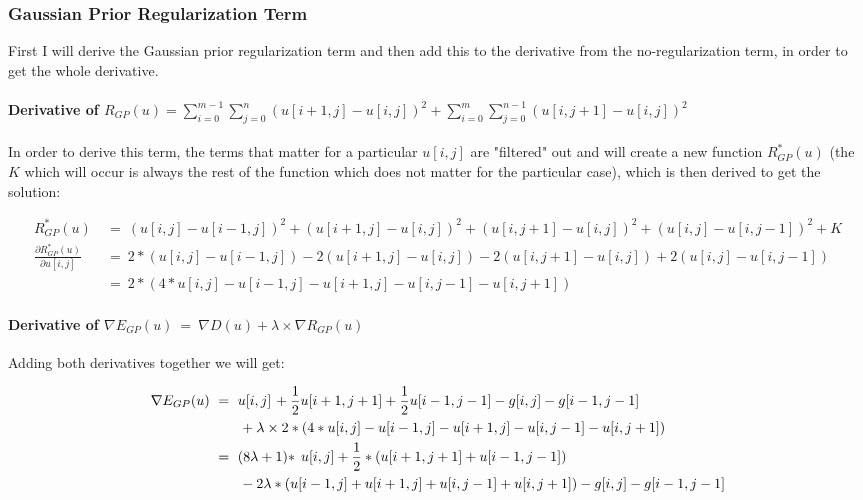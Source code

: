 \documentclass{report}
\begin{document}
			\subsubsection{Gaussian Prior Regularization Term}
			\startsubsection
				First I will derive the Gaussian prior regularization term and then add this to the derivative from the no-regularization term, in order to get the whole derivative.
				\vspace{-0.4cm} \paragraph{Derivative of $R_{GP}(u) = \sum_{i=0}^{m-1} \sum_{j=0}^{n} ( u[i+1,j] - u[i,j] )^2 + \sum_{i=0}^{m} \sum_{j=0}^{n-1} ( u[i,j+1] - u[i,j] )^2$}
				\startsubsection
					\vspace{0.2cm} In order to derive this term, the terms that matter for a particular $u[i,j]$ are "filtered" out and will create a new function $R_{GP}^*(u)$ (the $K$ which will occur is always the rest of the function which does not matter for the particular case), which is then derived to get the solution:
				\closesection
				\begin{adjustwidth}{-4em}{}
					\vspace{-0.5cm}
					\begin{align*}
						R_{GP}^*(u) \ & = \ (u[i,j] - u[i-1,j])^2 + (u[i+1,j] - u[i,j])^2 + (u[i,j+1] - u[i,j])^2 + (u[i,j] - u[i,j-1])^2 + K \\
						\frac{\partial R_{GP}^*(u)}{\partial u[i,j]} \ & = \ 2 * (u[i,j] - u[i-1,j]) - 2 (u[i+1,j] - u[i,j]) - 2 (u[i,j+1] - u[i,j]) + 2 (u[i,j] - u[i,j-1]) \\
						& = \ 2 * (4 * u[i,j] - u[i-1,j] - u[i+1,j] - u[i,j-1] - u[i,j+1])
					\end{align*}
				\end{adjustwidth}
				\vspace{-0.4cm} \paragraph{Derivative of $\nabla E_{GP}(u) \ = \ \nabla D(u) + \lambda \times \nabla R_{GP}(u)$}
				\startsubsection
					Adding both derivatives together we will get:
					\begin{adjustwidth}{-4em}{}
						\vspace{-0.5cm}
						\begin{align*}
							\nabla E_{GP}(u) \ & = \ u[i,j]  && \hspace{-0.9cm} + \frac{1}{2} u[i+1,j+1] + \frac{1}{2} u[i-1,j-1] - g[i,j] - g[i-1,j-1] \\
							&&& \hspace{-1.75cm} + \lambda \times 2 * (4 * u[i,j] - u[i-1,j] - u[i+1,j] - u[i,j-1] - u[i,j+1]) \\
							& = \ (8\lambda + 1) * && \hspace{-0.2cm} u[i,j] + \frac{1}{2} * (u[i+1,j+1] + u[i-1,j-1]) \\
							&&& \hspace{-1.75cm} - 2\lambda * (u[i-1,j] + u[i+1,j] + u[i,j-1] + u[i,j+1]) - g[i,j] - g[i-1,j-1]
						\end{align*}
					\end{adjustwidth}
\end{document}
